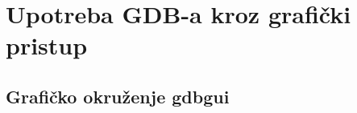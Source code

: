 \documentclass[a4paper]{article}
\begin{document}

\section{Upotreba GDB-a kroz grafički pristup}
\label{subsec:gui}


\subsection{Grafičko okruženje gdbgui}
\label{subsec:gdbgui}
\end{document}
